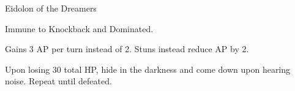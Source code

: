 \begin{monsterboxbg}{Eidolon of the Dreamers}

    \begin{rpg-monsteraction}[Presence]
        Immune to Knockback and Dominated.
    \end{rpg-monsteraction}

    \begin{rpg-monsteraction}[Boss]
        Gains 3 AP per turn instead of 2. Stuns instead reduce AP by 2.
    \end{rpg-monsteraction}

    \begin{rpg-monsteraction}
        Upon losing 30 total HP, hide in the darkness and come down upon hearing noise. Repeat until defeated.
    \end{rpg-monsteraction}

\end{monsterboxbg}








